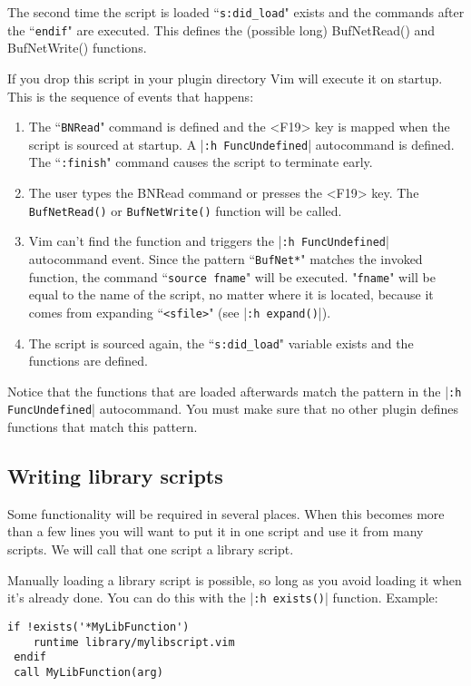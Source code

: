 The second time the script is loaded ``\texttt{s:did\_load}" exists and the commands after the ``\texttt{endif}" are executed.
This defines the (possible long) BufNetRead() and BufNetWrite() functions.

If you drop this script in your plugin directory Vim will execute it on startup.
This is the sequence of events that happens:

\begin{enumerate}
				\item The ``\texttt{BNRead}" command is defined and the <F19> key is mapped when the script is sourced at startup.
								A |\texttt{:h FuncUndefined}| autocommand is defined.
								The ``\texttt{:finish}" command causes the script to terminate early.
				\item The user types the BNRead command or presses the <F19> key.
								The \texttt{BufNetRead()} or \texttt{BufNetWrite()} function will be called.
				\item Vim can't find the function and triggers the |\texttt{:h FuncUndefined}| autocommand event.
								Since the pattern ``\texttt{BufNet*}" matches the invoked function, the command ``\texttt{source fname}" will be executed.
								"\texttt{fname}" will be equal to the name of the script, no matter where it is located, because it comes from expanding ``\texttt{<sfile>}" (see |\texttt{:h expand()}|).
				\item The script is sourced again, the ``\texttt{s:did\_load}" variable exists and the functions are defined.
\end{enumerate}

Notice that the functions that are loaded afterwards match the pattern in the |\texttt{:h FuncUndefined}| autocommand.
You must make sure that no other plugin defines functions that match this pattern.
\subsection{Writing library scripts}
\label{Writing library scripts}
\label{write-library-script}
Some functionality will be required in several places.
When this becomes more than a few lines you will want to put it in one script and use it from many scripts.
We will call that one script a library script.

Manually loading a library script is possible, so long as you avoid loading it when it's already done.
You can do this with the |\texttt{:h exists()}| function.
Example:

\begin{Verbatim}[samepage=true]
 if !exists('*MyLibFunction')
    runtime library/mylibscript.vim
 endif
 call MyLibFunction(arg)
\end{Verbatim}

